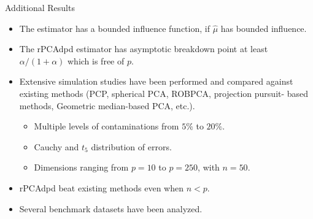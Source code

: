 \documentclass[10pt]{beamer}
\begin{document}
\begin{frame}{Additional Results}
    \begin{itemize}
        \item The estimator has a bounded influence function, if $\widehat{\mu}$ has bounded influence.
        \item The rPCAdpd estimator has asymptotic breakdown point at least $\alpha/(1+\alpha)$ which is free of $p$.
        \item Extensive simulation studies have been performed and compared against existing methods (PCP, spherical PCA, ROBPCA, projection pursuit- based methods, Geometric median-based PCA, etc.).
        \begin{itemize}
            \item Multiple levels of contaminations from $5\%$ to $20\%$.
            \item Cauchy and $t_5$ distribution of errors.
            \item Dimensions ranging from $p = 10$ to $p = 250$, with $n = 50$.
        \end{itemize}
        \item rPCAdpd beat existing methods even when $n < p$.
        \item Several benchmark datasets have been analyzed.
    \end{itemize}
\end{frame}
\end{document}
